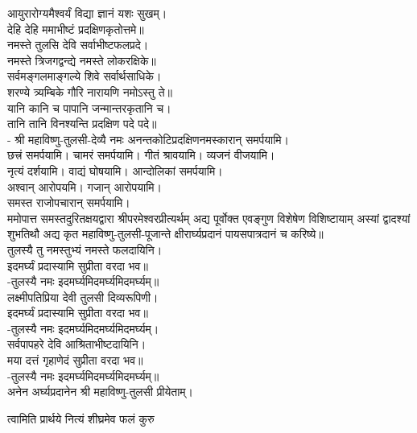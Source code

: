 आयुरारोग्यमैश्वर्यं विद्या ज्ञानं यशः सुखम्।\\
देहि देहि ममाभीष्टं प्रदक्षिणकृतोत्तमे॥\\

नमस्ते तुलसि देवि सर्वाभीष्टफलप्रदे।\\
नमस्ते त्रिजगद्वन्द्ये नमस्ते लोकरक्षिके॥\\

सर्वमङ्गलमाङ्गल्ये शिवे सर्वार्थसाधिके।\\
शरण्ये त्र्यम्बिके गौरि नारायणि नमोऽस्तु ते॥\\

यानि कानि च पापानि जन्मान्तरकृतानि च।\\
तानि तानि विनश्यन्ति प्रदक्षिण पदे पदे॥\\

- श्री महाविष्णु-तुलसी-देव्यै नमः अनन्तकोटिप्रदक्षिणनमस्कारान् समर्पयामि।\\
छत्त्रं समर्पयामि। चामरं समर्पयामि। गीतं श्रावयामि। व्यजनं वीजयामि।\\
नृत्यं दर्शयामि। वाद्यं घोषयामि। आन्दोलिकां समर्पयामि।\\
अश्वान् आरोपयमि। गजान् आरोपयामि।\\
समस्त राजोपचारान् समर्पयामि।\\


ममोपात्त समस्तदुरितक्षयद्वारा श्रीपरमेश्वरप्रीत्यर्थम् अद्य पूर्वोक्त एवङ्गुण विशेषेण विशिष्टायाम् अस्यां द्वादश्यां शुभतिथौ अद्य कृत महाविष्णु-तुलसी-पूजान्ते क्षीरार्घ्यप्रदानं पायसपात्रदानं च करिष्ये॥\\

तुलस्यै तु नमस्तुभ्यं नमस्ते फलदायिनि।\\
इदमर्घ्यं प्रदास्यामि सुप्रीता वरदा भव॥\\
-तुलस्यै नमः इदमर्घ्यमिदमर्घ्यमिदमर्घ्यम्॥\\
लक्ष्मीपतिप्रिया देवी तुलसी दिव्यरूपिणी।\\
इदमर्घ्यं प्रदास्यामि सुप्रीता वरदा भव॥\\
-तुलस्यै नमः इदमर्घ्यमिदमर्घ्यमिदमर्घ्यम्।\\
सर्वपापहरे देवि आश्रिताभीष्टदायिनि।\\
मया दत्तं गृहाणेदं सुप्रीता वरदा भव॥\\
-तुलस्यै नमः इदमर्घ्यमिदमर्घ्यमिदमर्घ्यम्॥\\
अनेन अर्घ्यप्रदानेन श्री महाविष्णु-तुलसी प्रीयेताम्।\\


{त्वामिति प्रार्थये नित्यं शीघ्रमेव फलं कुरु}

